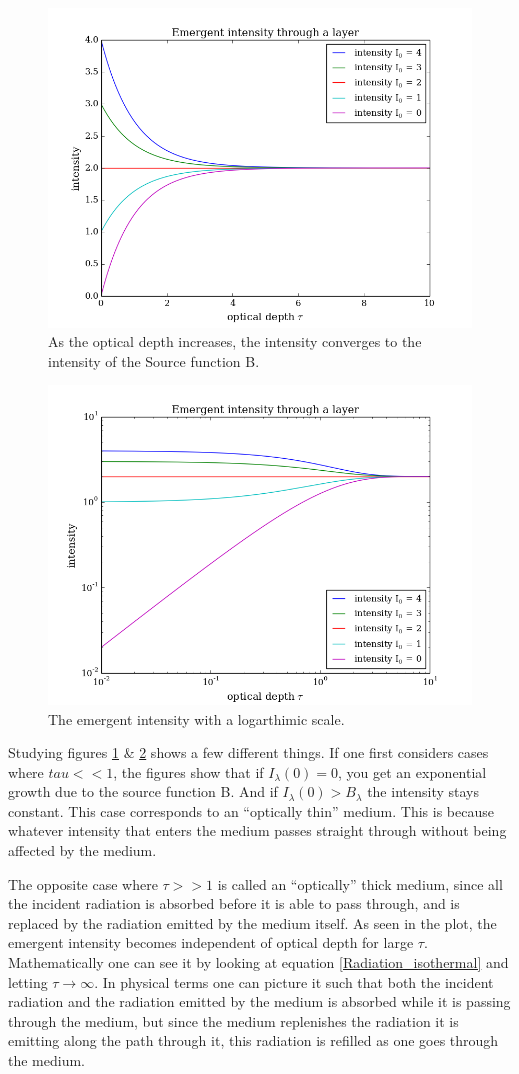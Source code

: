 \documentclass{aa}   %
\begin{document}
\begin{figure}
\includegraphics[width=.49\textwidth]{emergent_original.png}
\caption{As the optical depth increases, the intensity converges to the intensity of the Source function B.}
\label{emergent_original}
\end{figure}

\begin{figure}
 \includegraphics[width=.49\textwidth]{emergent_log.png}
 \caption{The emergent intensity with a logarthimic scale.}
 \label{emergent_log}
\end{figure}
Studying figures \ref{emergent_original} \& \ref{emergent_log} shows a few different things.
If one first considers cases where $tau << 1$, the figures show that if $I_\lambda(0) = 0$, you get an exponential growth due to the source function B. And if $I_\lambda(0) > B_\lambda$ the intensity stays constant. This case corresponds to an ``optically thin'' medium. This is because whatever intensity that enters the medium passes straight through without being affected by the medium.

The opposite case where $\tau >> 1$ is called an ``optically'' thick medium, since all the incident radiation is absorbed before it is able to pass through, and is replaced by the radiation emitted by the medium itself. As seen in the plot, the emergent intensity becomes independent of optical depth for large $\tau$. Mathematically one can see it by looking at equation \ref{Radiation_isothermal} and letting $\tau \rightarrow \infty$. In physical terms one can picture it such that both the incident radiation and the radiation emitted by the medium is absorbed while it is passing through the medium, but since the medium replenishes the radiation it is emitting along the path through it, this radiation is refilled as one goes through the medium.
\end{document}
